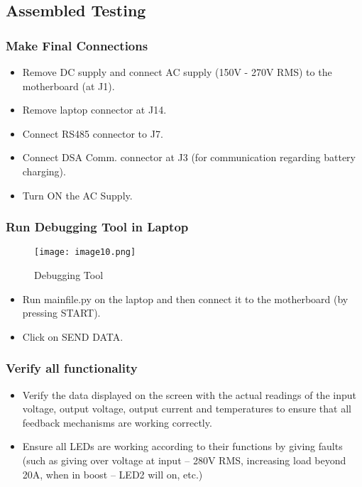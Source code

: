 \subsection{Assembled Testing}

\subsubsection{Make Final Connections}
\begin{itemize}
    \item Remove DC supply and connect AC supply (150V - 270V RMS) to the motherboard (at J1).
    \item Remove laptop connector at J14.
    \item Connect RS485 connector to J7. 
    \item Connect DSA Comm. connector at J3 (for communication regarding battery charging).
    \item Turn ON the AC Supply.
\end{itemize}

\subsubsection{Run Debugging Tool in Laptop}
\begin{figure}[H]
    \centering
    \texttt{[image: image10.png]}
    \caption{Debugging Tool}
    \label{fig:image10}
\end{figure}
\begin{itemize}
    \item Run mainfile.py on the laptop and then connect it to the motherboard (by pressing START).
    \item Click on SEND DATA.
\end{itemize}

\subsubsection{Verify all functionality}
\begin{itemize}
    \item Verify the data displayed on the screen with the actual readings of the input voltage, output voltage, output current and temperatures to ensure that all feedback mechanisms are working correctly.
    \item Ensure all LEDs are working according to their functions by giving faults (such as giving over voltage at input – 280V RMS, increasing load beyond 20A, when in boost – LED2 will on, etc.)
\end{itemize}